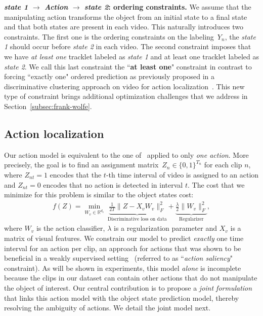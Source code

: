 \noindent\textbf{\emph{state 1}  $\rightarrow$ \emph{Action} $\rightarrow$  \emph{state 2}: ordering constraints.}
%
We assume that the manipulating action transforms the object from an initial state to a final state and that both states are present in each video.
This naturally introduces two constraints.
The first one is the ordering constraints on the labeling~$Y_n$, \ie the \emph{state 1} should occur before \emph{state 2} in each video.
The second constraint imposes that we have \emph{at least one} tracklet labeled as \emph{state 1} and at least one tracklet labeled as \emph{state 2}.
We call this last constraint the ``\textbf{at least one}" constraint in contrast to forcing ``exactly one" ordered prediction as previously proposed in a discriminative clustering approach on video for action localization~\cite{Bojanowski15weakly}.
This new type of constraint brings additional optimization challenges that we address in Section~\ref{subsec:frank-wolfe}.


\subsection{Action localization}
\label{sec:actionmodel}

Our action model is equivalent to the one of~\cite{Bojanowski15weakly} applied to only \emph{one action}. 
More precisely, the goal is to find an assignment matrix~$Z_n\in\{0,1\}^{T_n}$ for each clip $n$, where
$Z_{nt}=1$  encodes that the $t$-th time interval of video is assigned to an action and $Z_{nt}=0$ encodes that no action is detected in interval $t$.
The cost that we minimize for this problem is similar to the object states cost:
\vspace{-0.6mm}
\begin{align}
	f(Z) = \min_{W_v \in \mathbb{R}^{d_v}} \ \underbrace{\frac{1}{2T} \|Z - X_{v} W_{v}\|_F^2}_\text{Discriminative loss on data} + \underbrace{\frac{\lambda}{2} \|W_{v}\|_F^2}_\text{Regularizer} ,  
	\label{eq:actioncost} 
\end{align}
where $W_v$ is the action classifier, $\lambda$ is a regularization parameter and $X_v$ is a matrix of visual features.
We constrain our model to predict \emph{exactly} one time interval for an action per clip, an approach for actions that was shown to be beneficial in a weakly supervised setting~\cite{Bojanowski15weakly} (referred to as ``\emph{action saliency}" constraint).
%
As will be shown in experiments, this model \emph{alone} is incomplete because the clips in our dataset can contain other actions that do not manipulate the object of interest. 
Our central contribution is to propose a \emph{joint formulation} that links this action model with the object state prediction model, thereby resolving the ambiguity of actions.
We detail the joint model next.

